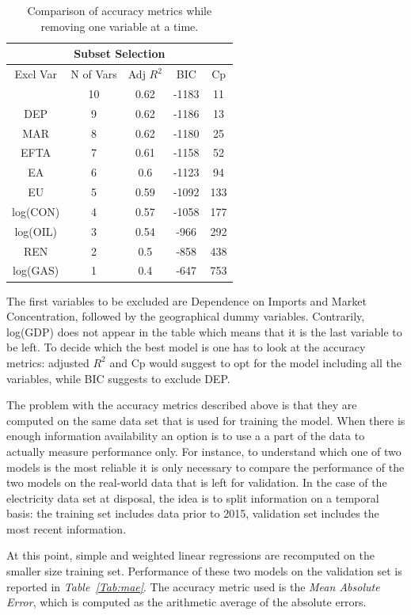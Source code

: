 \documentclass[a4paper,12pt]{book}
\begin{document}
\begin{table}[tb]
\begin{center}
\begin{tabular}{|c|c|c|c|c|}
\hline
\multicolumn{5}{|c|}{Subset Selection}\\
\hline
Excl Var&N of Vars&Adj $R^2$&BIC&Cp\\
\hline
&10&0.62&-1183&11\\
DEP&9&0.62&-1186&13\\
MAR&8&0.62&-1180&25\\
EFTA&7&0.61&-1158&52\\
EA&6&0.6&-1123&94\\
EU&5&0.59&-1092&133\\
log(CON)&4&0.57&-1058&177\\
log(OIL)&3&0.54&-966&292\\
REN&2&0.5&-858&438\\
log(GAS)&1&0.4&-647&753\\
\hline
\end{tabular}
\caption{Comparison of accuracy metrics while removing one variable at a time.}
\label{Tab:acc}
\end{center}
\end{table}

The first variables to be excluded are Dependence on Imports and Market Concentration, followed by the geographical dummy variables. Contrarily, log(GDP) does not appear in the table which means that it is the last variable to be left. To decide which the best model is one has to look at the accuracy metrics: adjusted $R^2$ and Cp would suggest to opt for the model including all the variables, while BIC suggests to exclude DEP.

The problem with the accuracy metrics described above is that they are computed on the same data set that is used for training the model. When there is enough information availability an option is to use a a part of the data to actually measure performance only. For instance, to understand which one of two models is the most reliable it is only necessary to compare the performance of the two models on the real-world data that is left for validation. In the case of the electricity data set at disposal, the idea is to split information on a temporal basis: the training set includes data prior to 2015, validation set includes the most recent information.

At this point, simple and weighted linear regressions are recomputed on the smaller size training set. Performance of these two models on the validation set is reported in \textit{Table~\ref{Tab:mae}}. The accuracy metric used is the \textit{Mean Absolute Error}, which is computed as the arithmetic average of the absolute errors.
\end{document}
